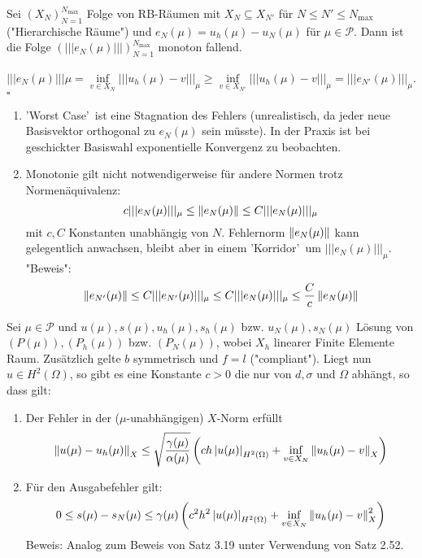 Sei $(X_N)_{N=1}^{N_{\max}}$ Folge von RB-Räumen mit $X_N\subseteq X_{N'}$ für $N\le N'\le N_{\max}$ ("Hierarchische Räume") und $e_N(\mu)= u_h(\mu)-u_N(\mu)$ für $\mu\in \mathcal{P}$.
Dann ist die Folge $(|||e_N(\mu)|||)_{N=1}^{N_{\max}}$ monoton fallend.\\

\\
\[
|||e_N(\mu)|||\mu = \inf\limits_{v\in X_N} |||u_h(\mu)-v|||_\mu \ge  \inf\limits_{v\in X_{N'}} |||u_h(\mu)-v|||_\mu = |||e_{N'}(\mu)|||_\mu.
\]
\hfill $\square$

\begin{enumerate}[(1)]
	\item 'Worst Case'~ist eine Stagnation des Fehlers (unrealistisch, da jeder neue Basisvektor orthogonal zu $e_N(\mu)$ sein müsste).
	In der Praxis ist bei geschickter Basiswahl exponentielle Konvergenz zu beobachten.
	\item Monotonie gilt nicht notwendigerweise für andere Normen trotz Normenäquivalenz:
	\[
	c|||e_N(\mu)|||_\mu \le \left\Vert e_N(\mu)\right\Vert \le C |||e_N(\mu)|||_\mu
	\]
	mit $c,C$ Konstanten unabhängig von $N$.
	Fehlernorm $\left\Vert e_N(\mu)\right\Vert$ kann gelegentlich anwachsen, bleibt aber in einem 'Korridor'~um $|||e_N(\mu)|||_\mu$.\\
	"Beweis":
	\[
	\left\Vert e_{N'}(\mu)\right\Vert \le C|||e_{N'}(\mu)|||_\mu \le C|||e_N(\mu)|||_\mu \le \frac{C}{c} \left\Vert e_N(\mu)\right\Vert
	\]
\end{enumerate}

Sei $\mu\in\mathcal{P}$ und $u(\mu),s(\mu),u_h(\mu),s_h(\mu)$ bzw. $u_N(\mu),s_N(\mu)$ Lösung von $(P(\mu)),(P_h(\mu))$ bzw. $(P_N(\mu))$, wobei $X_h$ linearer Finite Elemente Raum.
Zusätzlich gelte $b$ symmetrisch und $f=l$ ("compliant").
Liegt nun $u\in H^2(\Omega)$, so gibt es eine Konstante $c>0$ die nur von $d,\sigma$ und $\Omega$ abhängt, so dass gilt:
\begin{enumerate}
	\item Der Fehler in der ($\mu$-unabhängigen) $X$-Norm erfüllt
	\[
	\left\Vert u(\mu)-u_h(\mu)\right\Vert_X \le \sqrt{\frac{\gamma(\mu)}{\alpha(\mu)}} \left( ch\left\vert u(\mu)\right\vert_{H^2(\Omega)} + \inf\limits_{v\in X_N} \left\Vert u_h(\mu)-v\right\Vert_X\right)
	\]
	\item Für den Ausgabefehler gilt:
	\[
	0 \le s(\mu)-s_N(\mu) \le \gamma(\mu) \left( c^2h^2\left\vert u(\mu)\right\vert_{H^2(\Omega)} + \inf\limits_{v\in X_N} \left\Vert u_h(\mu)-v\right\Vert_X^2\right)
	\]
	Beweis: Analog zum Beweis von Satz 3.19 unter Verwendung von Satz 2.52.
\end{enumerate}

